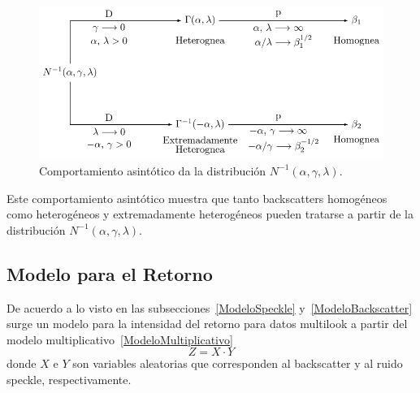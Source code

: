 \begin{figure}[hbt]
	\centering    
	\includegraphics[scale=1]{../../Figures/Tesis/Capitulo4/RelacionInversaGaussiana.pdf}
	\caption{\label{RelacionInversaGaussiana}Comportamiento asintótico da la distribución $N^{-1}(\alpha,\gamma,\lambda)$.} %
\end{figure} 

Este comportamiento asintótico muestra que tanto backscatters homogéneos como heterogéneos y extremadamente heterogéneos pueden tratarse a partir de la distribución $N^{-1}(\alpha,\gamma,\lambda)$.

\subsection{Modelo para el Retorno}
\label{Retorno}

De acuerdo a lo visto en las subsecciones~\ref{ModeloSpeckle} y~\ref{ModeloBackscatter} surge un modelo para la intensidad del retorno para datos multilook a partir del modelo multiplicativo~\ref{ModeloMultiplicativo}
\begin{equation*}
Z=X \cdot Y  
\end{equation*}
donde $X$ e $Y$ son variables aleatorias que corresponden al backscatter y al ruido speckle, respectivamente. 

